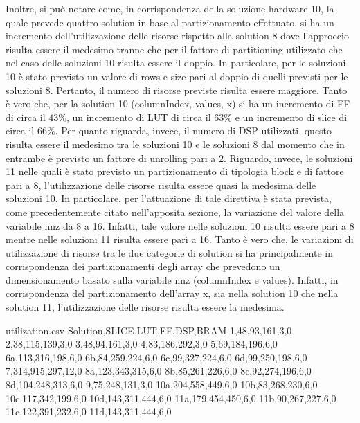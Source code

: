 Inoltre, si può notare come, in corrispondenza della soluzione hardware 10, la quale prevede quattro solution in base al partizionamento effettuato, si ha un incremento dell'utilizzazione delle risorse rispetto alla solution 8 dove l'approccio risulta essere il medesimo tranne che per il fattore di partitioning utilizzato che nel caso delle soluzioni 10 risulta essere il doppio. In particolare, per le soluzioni 10 è stato previsto un valore di rows e size pari al doppio di quelli previsti per le soluzioni 8. Pertanto, il numero di risorse previste risulta essere maggiore. Tanto è vero che, per la solution 10 (columnIndex, values, x) si ha un incremento di FF di circa il $43\%$, un incremento di LUT di circa il $63\%$ e un incremento di slice di circa il $66\%$. Per quanto riguarda, invece, il numero di DSP utilizzati, questo risulta essere il medesimo tra le soluzioni 10 e le soluzioni 8 dal momento che in entrambe è previsto un fattore di unrolling pari a 2. Riguardo, invece, le soluzioni 11 nelle quali è stato previsto un partizionamento di tipologia block e di fattore pari a 8, l'utilizzazione delle risorse risulta essere quasi la medesima delle soluzioni 10. In particolare, per l'attuazione di tale direttiva è stata prevista, come precedentemente citato nell'apposita sezione, la variazione del valore della variabile nnz da 8 a 16. Infatti, tale valore nelle soluzioni 10 risulta essere pari a 8 mentre nelle soluzioni 11 risulta essere pari a 16. Tanto è vero che, le variazioni di utilizzazione di risorse tra le due categorie di solution si ha principalmente in corrispondenza dei partizionamenti degli array che prevedono un dimensionamento basato sulla variabile nnz (columnIndex e values). Infatti, in corrispondenza del partizionamento dell'array x, sia nella solution 10 che nella solution 11, l'utilizzazione delle risorse risulta essere la medesima. 

\begin{filecontents}{utilization.csv}
	Solution,SLICE,LUT,FF,DSP,BRAM
	1,48,93,161,3,0
	2,38,115,139,3,0
	3,48,94,161,3,0
	4,83,186,292,3,0
	5,69,184,196,6,0
	6a,113,316,198,6,0
	6b,84,259,224,6,0
	6c,99,327,224,6,0
	6d,99,250,198,6,0
	7,314,915,297,12,0
	8a,123,343,315,6,0
	8b,85,261,226,6,0
	8c,92,274,196,6,0
	8d,104,248,313,6,0
	9,75,248,131,3,0
	10a,204,558,449,6,0
	10b,83,268,230,6,0
	10c,117,342,199,6,0
	10d,143,311,444,6,0
	11a,179,454,450,6,0
	11b,90,267,227,6,0
	11c,122,391,232,6,0
	11d,143,311,444,6,0
\end{filecontents}

